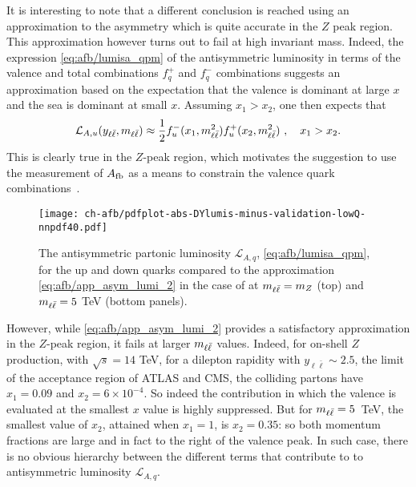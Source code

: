 It is interesting to note that a different conclusion is reached using
an approximation to the asymmetry which is quite accurate  in the $Z$
peak region.
%
This approximation however turns out to fail at high
invariant mass.
%
Indeed, the expression \cref{eq:afb/lumisa_qpm} of the antisymmetric
luminosity in terms of the valence 
and total \pdf combinations $f_q^+$ and $f_q^-$ \pdf combinations
suggests an approximation based on the expectation
that the valence is dominant at large $x$ and the sea is dominant at
small $x$. Assuming $x_1> x_2$, one then expects that
\begin{equation}
\mathcal{L}_{A,u}(y_{\ell\bar{\ell}},m_{\ell\bar{\ell}}) \approx\frac {1}{2} f_u^-(x_1,m_{\ell\bar{\ell}}^2)
f_{u}^+(x_2,m_{\ell\bar{\ell}}^2)   \,  \, ,\quad x_1>x_2.
\label{eq:afb/app_asym_lumi_2}
\end{equation}
This is clearly true  in the $Z$-peak region, which  motivates the suggestion
to use the measurement of $A_{\rm fb}$ as a means to constrain the valence
quark combinations~\cite{Accomando:2019vqt}.

\begin{figure}[!t]
 \centering
 \texttt{[image: ch-afb/pdfplot-abs-DYlumis-minus-validation-lowQ-nnpdf40.pdf]}
 \caption{The  antisymmetric partonic luminosity $\mathcal{L}_{A,q}$, \cref{eq:afb/lumisa_qpm},
for the up and down quarks 
compared to the approximation 
\cref{eq:afb/app_asym_lumi_2} in the case of 
at $m_{\ell\bar{\ell}}=m_Z$ (top)
and $m_{\ell\bar{\ell}}=5$ TeV (bottom panels).
 }    
 \label{fig:afb/pdfplot-abs-DYlumis-minus-validation-lowQ-nnpdf40}
\end{figure}

However, while \cref{eq:afb/app_asym_lumi_2} provides
a satisfactory approximation in the  $Z$-peak region,
it fails  at larger $m_{\ell\bar{\ell}}$ values. Indeed, for on-shell $Z$
production, with $\sqrt{s}=14$ TeV,
for a dilepton rapidity with $y_{\ell\bar{\ell}}\sim 2.5$, the limit of the
acceptance region
of ATLAS and CMS, the colliding partons have
$x_1=0.09$ and $x_2=6\times 10^{-4}$. So indeed the contribution in
which the valence \pdf is evaluated at the smallest $x$ value is highly suppressed.
%
But for $m_{\ell\bar{\ell}}=5$~TeV, the smallest value of $x_2$, attained when
$x_1=1$, is $x_2=0.35$: so both momentum fractions are large and in fact
to the right of the valence peak.
%
In such case, there 
is no obvious hierarchy between
the different terms that contribute to to antisymmetric
luminosity $\mathcal{L}_{A,q}$.

